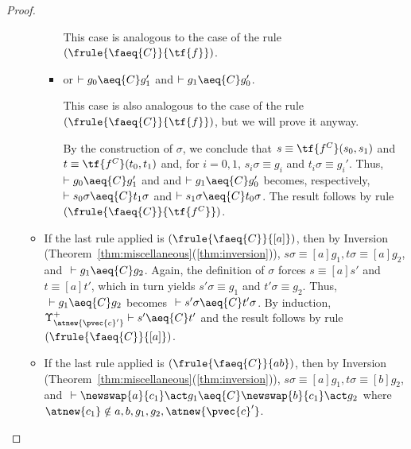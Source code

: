 \begin{proof}
\begin{enumerate}
\begin{itemize}
\begin{itemize}
            This case is analogous to the case of the rule $(\frule{\faeq{C}}{\tf{f}})$.

            \item  or $\vdash g_0 \aeq{C} g_1'$ and $\vdash g_1 \aeq{C} g_0'$.

            This case is also analogous to the case of the rule $(\frule{\faeq{C}}{\tf{f}})$, but we will prove it anyway.

            By the construction of $\sigma$, we conclude that $s\equiv \tf{f^C}(s_0,s_1)$ and $t\equiv\tf{f^C}(t_0,t_1)$ and, for $i=0,1$, $s_i\sigma \equiv g_i$ and $t_i\sigma \equiv g_i'$. Thus, $\vdash g_0 \aeq{C} g_1'$ and and $\vdash g_1 \aeq{C} g_0'$ becomes, respectively, $\vdash s_0\sigma \aeq{C} t_1\sigma$ and $\vdash s_1\sigma \aeq{C} t_0\sigma$. The result follows by rule $(\frule{\faeq{C}}{\tf{f^C}})$.
         \end{itemize}


          \item If the last rule applied is $(\frule{\faeq{C}}{[a]})$, then by Inversion (Theorem~\ref{thm:miscellaneous}(\ref{thm:inversion})), $s\sigma \equiv [a]g_1, t\sigma \equiv [a]g_2$, and $~\vdash g_1 \aeq{C} g_2$. Again, the definition of $\sigma$ forces $s \equiv [a]s'$ and $t\equiv [a]t'$, which in turn yields $s'\sigma \equiv g_1$ and $t'\sigma \equiv g_2$. Thus, $~\vdash g_1 \aeq{C} g_2$ becomes $~\vdash s'\sigma \aeq{C} t'\sigma$. By induction, $\Upsilon^+_{\atnew{\pvec{c}'}}\vdash s'\aeq{C} t'$ and the result follows by rule $(\frule{\faeq{C}}{[a]})$.

         \item If the last rule applied is $(\frule{\faeq{C}}{ab})$, then by Inversion (Theorem~\ref{thm:miscellaneous}(\ref{thm:inversion})), $ s\sigma \equiv [a]g_1, t\sigma \equiv [b]g_2$, and $~\vdash \newswap{a}{c_1}\act g_1 \aeq{C} \newswap{b}{c_1}\act g_2$ where $\atnew{c_1}\notin a,b,g_1,g_2,\atnew{\pvec{c}'}$.


\end{itemize}
\end{enumerate}
\end{proof}
